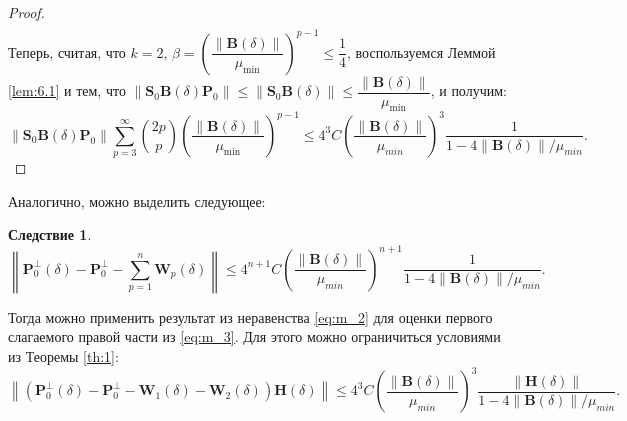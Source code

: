 \documentclass[specialist,
               substylefile = spbu_report.rtx,
               subf,href,colorlinks=true, 12pt]{disser}
\newcommand\norm[1]{\left\|#1\right\|}
\newtheorem{corollary}{Следствие}
\begin{document}
\begin{proof}
\begin{align*}
\end{align*}
Теперь, считая, что $k=2,\,\beta = \left(\dfrac{\norm{\mathbf{B}(\delta)}}{\mu_{\min}}\right)^{p-1} \leqslant\dfrac{1}{4}$, воспользуемся Леммой \ref{lem:6.1} и тем, что $\norm{\mathbf{S}_0\mathbf{B}(\delta)\mathbf{P}_0}\leqslant\norm{\mathbf{S}_0\mathbf{B}(\delta)}\leqslant\dfrac{\norm{\mathbf{B}(\delta)}}{\mu_{\min}}$, и получим:
\begin{equation*}
	\norm{\mathbf{S}_0\mathbf{B}(\delta)\mathbf{P}_0}\sum_{p=3}^\infty{2p\choose p}\left(\dfrac{\norm{\mathbf{B}(\delta)}}{\mu_{\min}}\right)^{p-1}\leqslant4^3C\left(\dfrac{\norm{\mathbf{B}(\delta)}}{\mu_{min}}\right)^3\dfrac{1}{1-4\norm{\mathbf{B}(\delta)}/\mu_{min}}.
\end{equation*}
\end{proof}
Аналогично, можно выделить следующее:
\begin{corollary}
	\begin{equation}\label{eq:m_2}
		\norm{\mathbf{P}_0^\bot(\delta) - \mathbf{P}_0^\bot - \sum\limits^n_{p=1}\mathbf{W}_p(\delta)} \leqslant 4^{n+1}C\left(\dfrac{\norm{\mathbf{B}(\delta)}}{\mu_{min}}\right)^{n+1}\dfrac{1}{1-4\norm{\mathbf{B}(\delta)}/\mu_{min}}.
	\end{equation}
\end{corollary}
Тогда можно применить результат из неравенства \eqref{eq:m_2} для оценки первого слагаемого правой части из \eqref{eq:m_3}. Для этого можно ограничиться условиями из Теоремы \ref{th:1}:
\begin{equation}
\label{eq:noneq_2}
	\norm{\left(\mathbf{P}_0^\bot(\delta) - \mathbf{P}_0^\bot - \mathbf{W}_1(\delta) - \mathbf{W}_2(\delta)\right)\mathbf{H}(\delta)} \leqslant 4^3C\left(\dfrac{\norm{\mathbf{B}(\delta)}}{\mu_{min}}\right)^3\dfrac{\norm{\mathbf{H}(\delta)}}{1-4\norm{\mathbf{B}(\delta)}/\mu_{min}}.
\end{equation}
\end{document}
